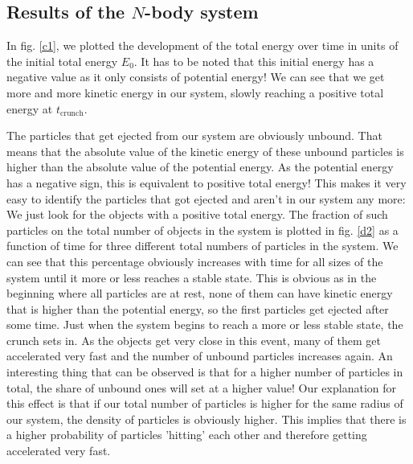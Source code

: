 \documentclass[10pt,a4paper]{article}
\begin{document}
\subsection{Results of the $N$-body system}
In fig. \ref{c1}, we plotted the development of the total energy over time in units of the initial total energy $E_0$. It has to be noted that this initial energy has a negative value as it only consists of potential energy! We can see that we get more and more kinetic energy in our system, slowly reaching a positive total energy at $t_\mathrm{crunch}$. 

The particles that get ejected from our system are obviously unbound. That means that the absolute value of the kinetic energy of these unbound particles is higher than the absolute value of the potential energy. As the potential energy has a negative sign, this is equivalent to positive total energy! This makes it very easy to identify the particles that got ejected and aren't in our system any more: We just look for the objects with a positive total energy. The fraction of such particles on the total number of objects in the system is plotted in fig. \ref{d2} as a function of time for three different total numbers of particles in the system. We can see that this percentage obviously increases with time for all sizes of the system until it more or less reaches a stable state. This is obvious as in the beginning where all particles are at rest, none of them can have kinetic energy that is higher than the potential energy, so the first particles get ejected after some time. Just when the system begins to reach a more or less stable state, the crunch sets in. As the objects get very close in this event, many of them get accelerated very fast and the number of unbound particles increases again. An interesting thing that can be observed is that for a higher number of particles in total, the share of unbound ones will set at a higher value! Our explanation for this effect is that if our total number of particles is higher for the same radius of our system, the density of particles is obviously higher. This implies that there is a higher probability of particles 'hitting' each other and therefore getting accelerated very fast.
\end{document}
